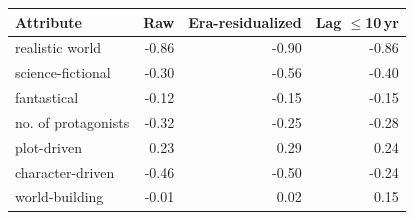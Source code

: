 \begin{tabular}{l r r r}
\toprule
Attribute & Raw & Era-residualized & Lag $\le$10\,yr \\
\midrule
realistic world & -0.86 & -0.90 & -0.86 \\
science-fictional & -0.30 & -0.56 & -0.40 \\
fantastical & -0.12 & -0.15 & -0.15 \\
no. of protagonists & -0.32 & -0.25 & -0.28 \\
plot-driven & 0.23 & 0.29 & 0.24 \\
character-driven & -0.46 & -0.50 & -0.24 \\
world-building & -0.01 & 0.02 & 0.15 \\
\bottomrule
\end{tabular}